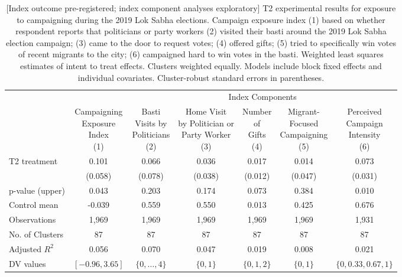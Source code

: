 \documentclass[
  11.5pt,
]{article}
\begin{document}
\clearpage

\clearpage

\begin{table}

\caption{\label{tab:unnamed-chunk-12}[Index outcome pre-registered; index component analyses exploratory] T2 experimental results for exposure to campaigning during the 2019 Lok Sabha elections. Campaign exposure index (1) based on whether respondent reports that politicians or party workers (2) visited their basti around the 2019 Lok Sabha election campaign; (3) came to the door to request votes; (4) offered gifts; (5) tried to specifically win votes of recent migrants to the city; (6) campaigned hard to win votes in the basti. Weighted least squares estimates of intent to treat effects. Clusters weighted equally. Models include block fixed effects and individual covariates. Cluster-robust standard errors in parentheses.}
\centering
\fontsize{10}{12}\selectfont
\begin{tabular}[t]{lcccccc}
\toprule
\multicolumn{1}{c}{} & \multicolumn{1}{c}{ } & \multicolumn{5}{c}{Index Components} \\
\cmidrule(l{3pt}r{3pt}){3-7}
 & \makecell[c]{Campaigning\\ Exposure\\ Index \\(1)} & \makecell[c]{Basti\\Visits by\\ Politicians \\(2)} & \makecell[c]{Home Visit\\ by Politician or\\ Party Worker  \\(3)} & \makecell[c]{Number\\ of\\ Gifts \\(4)} & \makecell[c]{Migrant-\\ Focused\\ Campaigning \\(5)} & \makecell[c]{Perceived\\ Campaign\\ Intensity \\(6)}\\
\midrule
T2 treatment & 0.101 & 0.066 & 0.036 & 0.017 & 0.014 & 0.073\\
 & (0.058) & (0.078) & (0.038) & (0.012) & (0.047) & (0.031)\\
\midrule
p-value (upper) & 0.043 & 0.203 & 0.174 & 0.073 & 0.384 & 0.010\\
Control mean & -0.039 & 0.559 & 0.550 & 0.013 & 0.425 & 0.676\\
Observations & 1,969 & 1,969 & 1,969 & 1,969 & 1,969 & 1,931\\
No. of Clusters & 87 & 87 & 87 & 87 & 87 & 87\\
Adjusted $R^2$ & 0.056 & 0.070 & 0.047 & 0.019 & 0.008 & 0.021\\
DV values & $[-0.96, 3.65]$ & $\{0, \ldots, 4\}$ & $\{0, 1\}$ & $\{0, 1, 2\}$ & $\{0, 1\}$ & $\{0, 0.33, 0.67, 1\}$\\
\bottomrule
\end{tabular}
\end{table}
\end{document}
